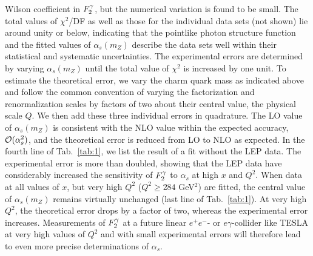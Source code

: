 \documentclass[aps,prl,twocolumn,groupedaddress]{revtex4}
\begin{document}
Wilson coefficient in $\f2y$, but the numerical variation is found to be
small. The total values of $\chi^2$/DF as well as those for the
individual data sets (not shown) lie around unity or below, indicating that
the pointlike photon structure function and the fitted values of
$\alpha_s(m_Z)$ describe the data sets well within their statistical and
systematic uncertainties. The experimental errors are determined by varying
$\alpha_s(m_Z)$ until the total value of $\chi^2$ is increased by one unit.
To estimate the theoretical error, we vary the charm quark mass as indicated
above and follow the common convention of varying the factorization and
renormalization scales by factors of two about their central value, the
physical scale $Q$. We then add these three individual errors in quadrature.
The LO value of $\alpha_s(m_Z)$ is consistent
with the NLO value within the expected accuracy, ${\cal O}(\alpha_s^2)$, and the
theoretical error is reduced from LO to NLO as expected.
In the fourth line of Tab.\ \ref{tab:1}, we list the result of a fit without
the LEP data. The experimental error is more than doubled, showing that the
LEP data have considerably increased the sensitivity of $\f2y$ to $\alpha_s$
at high $x$ and $Q^2$.
When data at all values of $x$, but very high $Q^2$ ($Q^2\geq 284$ GeV$^2$)
are fitted, the central value of $\alpha_s(m_Z)$ remains virtually unchanged
(last line of Tab.\ \ref{tab:1}).
At very high $Q^2$, the
theoretical error drops by a factor of two, whereas the experimental error
increases. Measurements of $\f2y$ at a future linear $e^+e^-$- or
$e\gamma$-collider like TESLA at very high values of $Q^2$ and with small
experimental errors will therefore lead to even more precise determinations of
$\alpha_s$.
\end{document}
